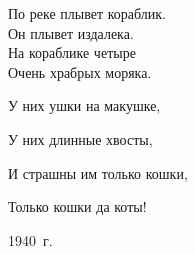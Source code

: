 \begin{flushleft}
	По реке плывет кораблик.\\
	Он плывет издалека.\\
	На кораблике четыре\\
	Очень храбрых моряка.
\end{flushleft}


\begin{center}
	\hspace*{2cm}
	\begin{minipage}{0.45\textwidth}
		У них ушки на макушке,
		
		У них длинные хвосты,
		
		И страшны им только кошки,
		
		Только кошки да коты!
	\end{minipage}
\end{center}

\begin{flushright}
	1940~г.
\end{flushright}